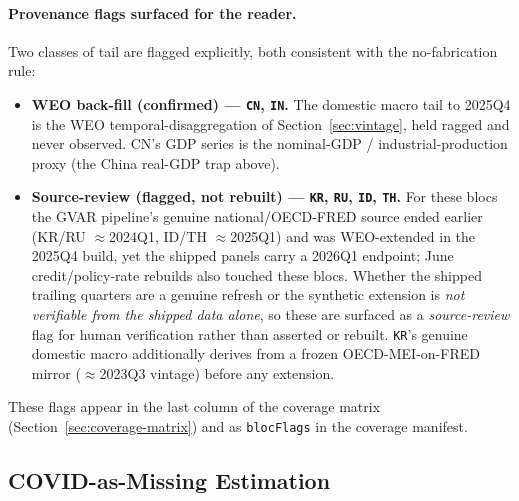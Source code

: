 \documentclass[11pt]{article}
\theoremstyle{definition}
\theoremstyle{remark}
\begin{document}
\paragraph{Provenance flags surfaced for the reader.} Two classes of tail
are flagged explicitly, both consistent with the no-fabrication rule:
\begin{itemize}
  \item \textbf{WEO back-fill (confirmed) --- \texttt{CN}, \texttt{IN}.}
    The domestic macro tail to 2025Q4 is the WEO temporal-disaggregation
    of Section~\ref{sec:vintage}, held ragged and never observed. CN's GDP
    series is the nominal-GDP / industrial-production proxy (the China
    real-GDP trap above).
  \item \textbf{Source-review (flagged, not rebuilt) --- \texttt{KR},
    \texttt{RU}, \texttt{ID}, \texttt{TH}.} For these blocs the GVAR
    pipeline's genuine national/OECD-FRED source ended earlier
    (KR/RU $\approx$2024Q1, ID/TH $\approx$2025Q1) and was WEO-extended in
    the 2025Q4 build, yet the shipped panels carry a 2026Q1 endpoint; June
    credit/policy-rate rebuilds also touched these blocs. Whether the
    shipped trailing quarters are a genuine refresh or the synthetic
    extension is \emph{not verifiable from the shipped data alone}, so
    these are surfaced as a \emph{source-review} flag for human
    verification rather than asserted or rebuilt. \texttt{KR}'s genuine
    domestic macro additionally derives from a frozen OECD-MEI-on-FRED
    mirror ($\approx$2023Q3 vintage) before any extension.
\end{itemize}
These flags appear in the last column of the coverage matrix
(Section~\ref{sec:coverage-matrix}) and as \texttt{blocFlags} in the
coverage manifest.

\subsection{COVID-as-Missing Estimation}\label{sec:covid}
\end{document}
